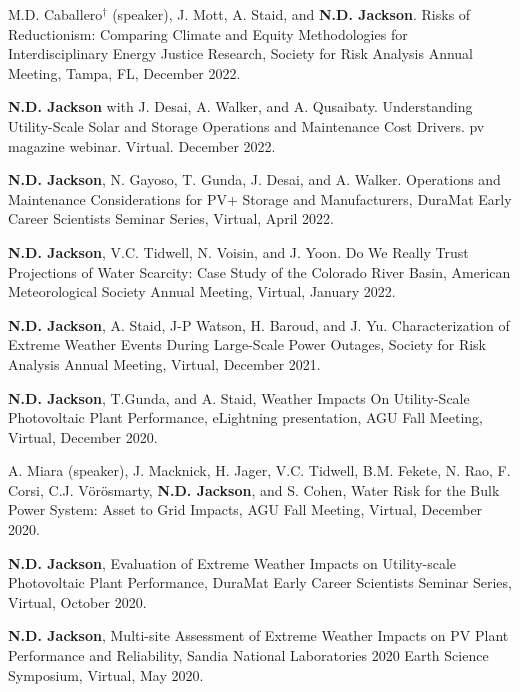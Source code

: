 \documentclass{article}[12pt]
\begin{document}
\begin{etaremune}[]
		\item M.D. Caballero$^{\dagger}$ (speaker), J. Mott, A. Staid, and \textbf{N.D. Jackson}. Risks of Reductionism: Comparing Climate and Equity Methodologies for Interdisciplinary Energy Justice Research, Society for Risk Analysis Annual Meeting, Tampa, FL, December 2022. 
		
		\item \textbf{N.D. Jackson} with J. Desai, A. Walker, and A. Qusaibaty. Understanding Utility-Scale Solar and Storage Operations and Maintenance Cost Drivers. pv magazine webinar. Virtual. December 2022. 
		
		\item \textbf{N.D. Jackson}, N. Gayoso, T. Gunda, J. Desai, and A. Walker. Operations and Maintenance Considerations for PV+ Storage and Manufacturers, DuraMat Early Career Scientists Seminar Series, Virtual, April 2022. 
		
		\item \textbf{N.D. Jackson}, V.C. Tidwell, N. Voisin, and J. Yoon. Do We Really Trust Projections of Water Scarcity: Case Study of the Colorado River Basin, American Meteorological Society Annual Meeting, Virtual, January 2022.
		
		\item \textbf{N.D. Jackson}, A. Staid, J-P Watson, H. Baroud, and J. Yu. Characterization of Extreme Weather Events During Large-Scale Power Outages, Society for Risk Analysis Annual Meeting, Virtual, December 2021.
		
		\item \textbf{N.D. Jackson}, T.Gunda, and A. Staid, Weather Impacts On Utility-Scale Photovoltaic Plant Performance, eLightning presentation, AGU Fall Meeting, Virtual, December 2020.
		
		\item A. Miara (speaker), J. Macknick, H. Jager, V.C. Tidwell, B.M. Fekete, N. Rao, F. Corsi, C.J. V{\"o}r{\"o}smarty, \textbf{N.D. Jackson}, and S. Cohen, Water Risk for the Bulk Power System: Asset to Grid Impacts, AGU Fall Meeting, Virtual, December 2020.
		
		\item \textbf{N.D. Jackson}, Evaluation of Extreme Weather Impacts on Utility-scale Photovoltaic Plant Performance, DuraMat Early Career Scientists Seminar Series, Virtual, October 2020.
		
		\item \textbf{N.D. Jackson},  Multi-site Assessment of Extreme Weather Impacts on PV Plant Performance and Reliability, Sandia National Laboratories 2020 Earth Science Symposium, Virtual, May 2020. 
		

\end{etaremune}
\end{document}
